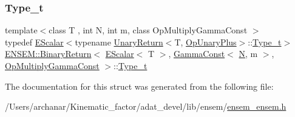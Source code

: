 \subsubsection{\texorpdfstring{Type\_t}{Type\_t}\hspace{0.1cm}{\footnotesize\ttfamily [2/2]}}
{\footnotesize\ttfamily template$<$class T , int N, int m, class Op\+Multiply\+Gamma\+Const $>$ \\
typedef \mbox{\hyperlink{classENSEM_1_1EScalar}{E\+Scalar}}$<$typename \mbox{\hyperlink{structENSEM_1_1UnaryReturn}{Unary\+Return}}$<$T, \mbox{\hyperlink{structENSEM_1_1OpUnaryPlus}{Op\+Unary\+Plus}}$>$\+::\mbox{\hyperlink{structENSEM_1_1BinaryReturn_3_01EScalar_3_01T_01_4_00_01GammaConst_3_01N_00_01m_01_4_00_01OpMultiplyGammaConst_01_4_a32c24d4ee935ad275ff272dc1c66dc9e}{Type\+\_\+t}}$>$ \mbox{\hyperlink{structENSEM_1_1BinaryReturn}{E\+N\+S\+E\+M\+::\+Binary\+Return}}$<$ \mbox{\hyperlink{classENSEM_1_1EScalar}{E\+Scalar}}$<$ T $>$, \mbox{\hyperlink{classENSEM_1_1GammaConst}{Gamma\+Const}}$<$ \mbox{\hyperlink{operator__name__util_8cc_a7722c8ecbb62d99aee7ce68b1752f337}{N}}, m $>$, \mbox{\hyperlink{structENSEM_1_1OpMultiplyGammaConst}{Op\+Multiply\+Gamma\+Const}} $>$\+::\mbox{\hyperlink{structENSEM_1_1BinaryReturn_3_01EScalar_3_01T_01_4_00_01GammaConst_3_01N_00_01m_01_4_00_01OpMultiplyGammaConst_01_4_a32c24d4ee935ad275ff272dc1c66dc9e}{Type\+\_\+t}}}



The documentation for this struct was generated from the following file\+:\begin{DoxyCompactItemize}
\item 
/\+Users/archanar/\+Kinematic\+\_\+factor/adat\+\_\+devel/lib/ensem/\mbox{\hyperlink{lib_2ensem_2ensem__ensem_8h}{ensem\+\_\+ensem.\+h}}\end{DoxyCompactItemize}
